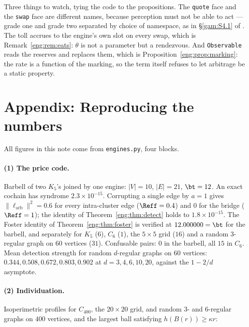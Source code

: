 Three things to watch, tying the code to the propositions. The
\texttt{quote} face and the \texttt{swap} face are different names, because
perception must not be able to act --- grade one and grade two separated by
choice of namespace, as in \S\ref{gam:S4.1} of \chGame. The toll accrues to the
engine's own slot on every swap, which is Remark~\ref{eng:rem:eats}: $\theta$ is
not a parameter but a rendezvous. And \texttt{Observable} reads the
reserves and replaces them, which is Proposition~\ref{eng:prop:marking}: the
rate is a function of the marking, so the term itself refuses to let
arbitrage be a static property.

\section{Appendix: Reproducing the numbers}\label{eng:S16}
\label{eng:app:repro}

All figures in this note come from \texttt{engines.py}, four blocks.

\paragraph{(1) The price code.} Barbell of two $K_5$'s joined by one
engine: $|V| = 10$, $|E| = 21$, $\bt = 12$. An exact cochain has syndrome
$2.3 \times 10^{-15}$. Corrupting a single edge by $a = 1$ gives
$\|\ell_{\mathrm{arb}}\|^2 = 0.6$ for every intra-cluster edge
($\Reff = 0.4$) and $0$ for the bridge ($\Reff = 1$); the identity of
Theorem~\ref{eng:thm:detect} holds to $1.8\times10^{-15}$. The Foster identity
of Theorem~\ref{eng:thm:foster} is verified at $12.000000 = \bt$ for the
barbell, and separately for $K_5$ ($6$), $C_6$ ($1$), the $5\times5$ grid
($16$) and a random $3$-regular graph on $60$ vertices ($31$). Confusable
pairs: $0$ in the barbell, all $15$ in $C_6$. Mean detection strength for
random $d$-regular graphs on $60$ vertices: $0.344, 0.508, 0.672, 0.803,
0.902$ at $d = 3,4,6,10,20$, against the $1-2/d$ asymptote.

\paragraph{(2) Individuation.} Isoperimetric profiles for $C_{400}$, the
$20\times20$ grid, and random $3$- and $6$-regular graphs on $400$
vertices, and the largest ball satisfying $h(B(r)) \geq \kappa r$:

\begin{center}\small
{}
\end{center}

